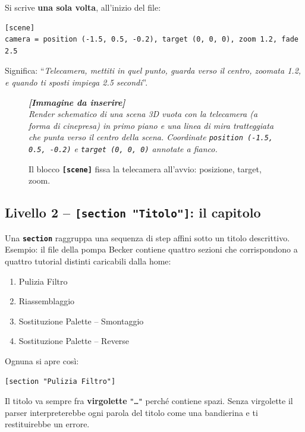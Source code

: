 ﻿\documentclass[a4paper,12pt,oneside]{book}
\newcommand{\sez}[1]{\texttt{\color{sectioncolor}\textbf{#1}}}
\newcommand{\imgph}[2]{%
  \begin{tcolorbox}[colback=cvtlightblue!30,colframe=cvtblue!40,%
    width=#1,halign=center,valign=center,height=5cm,boxrule=0.5pt,arc=3pt]%
    \textcolor{cvtgray}{\itshape\footnotesize\textbf{[Immagine da inserire]}\\[3pt]#2}%
  \end{tcolorbox}}
\begin{document}
Si scrive \textbf{una sola volta}, all'inizio del file:

\begin{lstlisting}
[scene]
camera = position (-1.5, 0.5, -0.2), target (0, 0, 0), zoom 1.2, fade 2.5
\end{lstlisting}

Significa: ``\emph{Telecamera, mettiti in quel punto, guarda verso il centro,
zoomata 1.2, e quando ti sposti impiega 2.5 secondi}''.

\begin{figure}[H]
  \centering
  \imgph{11cm}{Render schematico di una scena 3D vuota con la telecamera (a forma di cinepresa) in primo piano e una linea di mira tratteggiata che punta verso il centro della scena. Coordinate \texttt{position (-1.5, 0.5, -0.2)} e \texttt{target (0, 0, 0)} annotate a fianco.}
  \caption{Il blocco \sez{[scene]} fissa la telecamera all'avvio: posizione, target, zoom.}
  \label{fig:scena-iniziale}
\end{figure}

\subsection{Livello 2 -- \texttt{[section "Titolo"]}: il capitolo}

Una \sez{section} raggruppa una sequenza di step affini sotto un titolo
descrittivo. Esempio: il file della pompa Becker contiene quattro sezioni
che corrispondono a quattro tutorial distinti caricabili dalla home:

\begin{enumerate}
  \item Pulizia Filtro
  \item Riassemblaggio
  \item Sostituzione Palette -- Smontaggio
  \item Sostituzione Palette -- Reverse
\end{enumerate}

Ognuna si apre così:

\begin{lstlisting}
[section "Pulizia Filtro"]
\end{lstlisting}

\begin{attenzione}
Il titolo va sempre fra \textbf{virgolette} \texttt{"\ldots"} perché contiene
spazi. Senza virgolette il parser interpreterebbe ogni parola del titolo
come una bandierina e ti restituirebbe un errore.
\end{attenzione}
\end{document}
